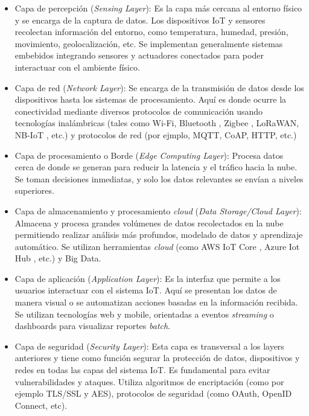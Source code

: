 \begin{itemize}

	\item Capa de percepción (\textit{Sensing Layer}): Es la capa más cercana al entorno físico y se encarga de la captura de datos. Los dispositivos IoT y sensores recolectan información del entorno, como temperatura, humedad, presión, movimiento, geolocalización, etc. Se implementan generalmente sistemas embebidos integrando sensores y actuadores conectados para poder interactuar con el ambiente físico.
	
	\item Capa de red (\textit{Network Layer}): Se encarga de la transmisión de datos desde los dispositivos hasta los sistemas de procesamiento. Aquí es donde ocurre la conectividad mediante diversos protocolos de comunicación usando tecnologías inalámbricas (tales como Wi-Fi, Bluetooth \citep{Bluetooth}, Zigbee \citep{zigbee}, LoRaWAN, NB-IoT \citep{Narrowband_IoT}, etc.) y protocolos de red (por ejmplo, MQTT, CoAP, HTTP, etc.)
	
	\item Capa de procesamiento o Borde (\textit{Edge Computing Layer}): Procesa datos cerca de donde se generan para reducir la latencia y el tráfico hacia la nube. Se toman decisiones inmediatas, y solo los datos relevantes se envían a niveles superiores. 
	
	\item Capa de almacenamiento y procesamiento \textit{cloud} (\textit{Data Storage/Cloud Layer}): Almacena y procesa grandes volúmenes de datos recolectados en la nube permitiendo realizar análisis más profundos, modelado de datos y aprendizaje automático. Se utilizan herramientas \textit{cloud} (como AWS IoT Core \citep{aws_iot_core}, Azure Iot Hub \citep{azure_iot}, etc.) y Big Data.
	
	\item Capa de aplicación (\textit{Application Layer}): Es la interfaz que permite a los usuarios interactuar con el sistema IoT. Aquí se presentan los datos de manera visual o se automatizan acciones basadas en la información recibida. Se utilizan tecnologías web y mobile, orientadas a eventos \textit{streaming} o dashboards para visualizar reportes \textit{batch}.
	
	\item Capa de seguridad (\textit{Security Layer}): Esta capa es transversal a los layers anteriores y tiene como función segurar la protección de datos, dispositivos y redes en todas las capas del sistema IoT. Es fundamental para evitar vulnerabilidades y ataques. Utiliza algoritmos de encriptación (como por ejemplo TLS/SSL y AES), protocolos de seguridad (como OAuth, OpenID Connect, etc).
	
\end{itemize}


